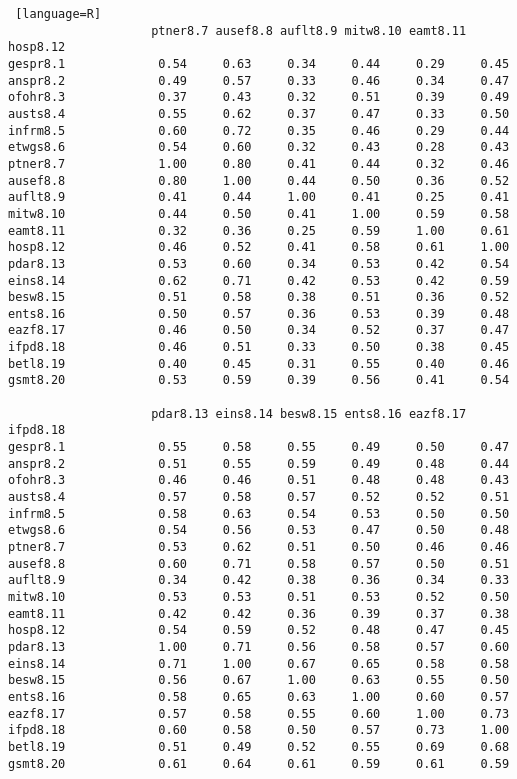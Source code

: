 \begin{lstlisting} [language=R]
                    ptner8.7 ausef8.8 auflt8.9 mitw8.10 eamt8.11 hosp8.12
gespr8.1             0.54     0.63     0.34     0.44     0.29     0.45
anspr8.2             0.49     0.57     0.33     0.46     0.34     0.47
ofohr8.3             0.37     0.43     0.32     0.51     0.39     0.49
austs8.4             0.55     0.62     0.37     0.47     0.33     0.50
infrm8.5             0.60     0.72     0.35     0.46     0.29     0.44
etwgs8.6             0.54     0.60     0.32     0.43     0.28     0.43
ptner8.7             1.00     0.80     0.41     0.44     0.32     0.46
ausef8.8             0.80     1.00     0.44     0.50     0.36     0.52
auflt8.9             0.41     0.44     1.00     0.41     0.25     0.41
mitw8.10             0.44     0.50     0.41     1.00     0.59     0.58
eamt8.11             0.32     0.36     0.25     0.59     1.00     0.61
hosp8.12             0.46     0.52     0.41     0.58     0.61     1.00
pdar8.13             0.53     0.60     0.34     0.53     0.42     0.54
eins8.14             0.62     0.71     0.42     0.53     0.42     0.59
besw8.15             0.51     0.58     0.38     0.51     0.36     0.52
ents8.16             0.50     0.57     0.36     0.53     0.39     0.48
eazf8.17             0.46     0.50     0.34     0.52     0.37     0.47
ifpd8.18             0.46     0.51     0.33     0.50     0.38     0.45
betl8.19             0.40     0.45     0.31     0.55     0.40     0.46
gsmt8.20             0.53     0.59     0.39     0.56     0.41     0.54

                    pdar8.13 eins8.14 besw8.15 ents8.16 eazf8.17 ifpd8.18
gespr8.1             0.55     0.58     0.55     0.49     0.50     0.47
anspr8.2             0.51     0.55     0.59     0.49     0.48     0.44
ofohr8.3             0.46     0.46     0.51     0.48     0.48     0.43
austs8.4             0.57     0.58     0.57     0.52     0.52     0.51
infrm8.5             0.58     0.63     0.54     0.53     0.50     0.50
etwgs8.6             0.54     0.56     0.53     0.47     0.50     0.48
ptner8.7             0.53     0.62     0.51     0.50     0.46     0.46
ausef8.8             0.60     0.71     0.58     0.57     0.50     0.51
auflt8.9             0.34     0.42     0.38     0.36     0.34     0.33
mitw8.10             0.53     0.53     0.51     0.53     0.52     0.50
eamt8.11             0.42     0.42     0.36     0.39     0.37     0.38
hosp8.12             0.54     0.59     0.52     0.48     0.47     0.45
pdar8.13             1.00     0.71     0.56     0.58     0.57     0.60
eins8.14             0.71     1.00     0.67     0.65     0.58     0.58
besw8.15             0.56     0.67     1.00     0.63     0.55     0.50
ents8.16             0.58     0.65     0.63     1.00     0.60     0.57
eazf8.17             0.57     0.58     0.55     0.60     1.00     0.73
ifpd8.18             0.60     0.58     0.50     0.57     0.73     1.00
betl8.19             0.51     0.49     0.52     0.55     0.69     0.68
gsmt8.20             0.61     0.64     0.61     0.59     0.61     0.59


\end{lstlisting}
